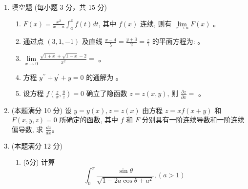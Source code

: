 

\begin{enumerate}
	\item
填空题 (每小题 3 分，共 15 分)
\begin{enumerate}
	\item
$F(x)=\frac{x^{2}}{x-a} \int_{a}^{x} f(t) d t$, 其中 $f(x)$ 连续, 则有 $\lim\limits _{x \rightarrow a} F(x)$ \tk{} 。
\item 
通过点 $(3,1,-1)$ 及直线 $\frac{x-4}{5}=\frac{y+3}{2}=\frac{z}{1}$ 的平面方程为: \tk{} 。

\item 
$\lim\limits _{x \rightarrow 0} \frac{\sqrt{1+x}+\sqrt{1-x}-2}{x^{2}}=$ \tk{} 。

\item 
方程 $y^{\prime \prime}+y^{\prime}+y=0$ 的通解为 \tk{} 。


\item 
设方程 $f\left(\frac{z}{x}, \frac{y}{z}\right)=0$ 确立了隐函数 $z=z(x, y)$, 则 $\frac{\partial z}{\partial x}=$ \tk{} 。
	
	
	
	
\end{enumerate}




\item 
(本题满分 10 分)
设 $y=y(x), z=z(x)$ 由方程 $z=x f(x+y)$ 和 $F(x, y, z)=0$ 所确定的函数, 其中 $f$ 和 $F$ 分别具有一阶连续导数和一阶连续偏导数, 求 $\frac{d z}{d x}$。



\banswer{
	
}


\item 
(本题满分 12 分)
\begin{enumerate}
	\item
(5分)
计算
	\[
	\int_{0}^{\pi} \frac{\sin \theta}{\sqrt{1-2 a \cos \theta+a^{2}}},(a>1)
	\]
	

\end{enumerate}
\end{enumerate}
